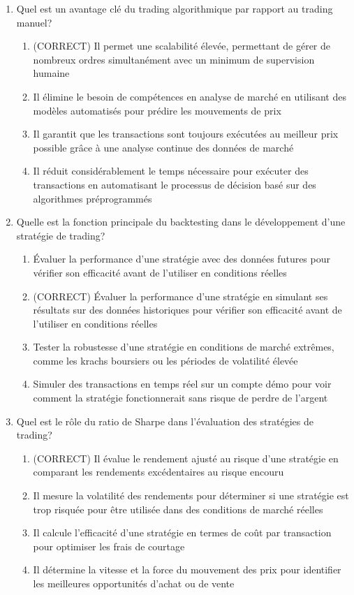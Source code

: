 \documentclass[a4paper,12pt]{article}
\begin{document}
\begin{enumerate}
    \item Quel est un avantage clé du trading algorithmique par rapport au trading manuel?
    \begin{enumerate}[label=(\Alph*)]
        \item (CORRECT) Il permet une scalabilité élevée, permettant de gérer de nombreux ordres simultanément avec un minimum de supervision humaine
        \item Il élimine le besoin de compétences en analyse de marché en utilisant des modèles automatisés pour prédire les mouvements de prix
        \item Il garantit que les transactions sont toujours exécutées au meilleur prix possible grâce à une analyse continue des données de marché
        \item Il réduit considérablement le temps nécessaire pour exécuter des transactions en automatisant le processus de décision basé sur des algorithmes préprogrammés
    \end{enumerate}

    \item Quelle est la fonction principale du backtesting dans le développement d'une stratégie de trading?
    \begin{enumerate}[label=(\Alph*)]
        \item Évaluer la performance d'une stratégie avec des données futures pour vérifier son efficacité avant de l'utiliser en conditions réelles
        \item (CORRECT) Évaluer la performance d'une stratégie en simulant ses résultats sur des données historiques pour vérifier son efficacité avant de l'utiliser en conditions réelles
        \item Tester la robustesse d'une stratégie en conditions de marché extrêmes, comme les krachs boursiers ou les périodes de volatilité élevée
        \item Simuler des transactions en temps réel sur un compte démo pour voir comment la stratégie fonctionnerait sans risque de perdre de l'argent
    \end{enumerate}

    \item Quel est le rôle du ratio de Sharpe dans l'évaluation des stratégies de trading?
    \begin{enumerate}[label=(\Alph*)]
        \item (CORRECT) Il évalue le rendement ajusté au risque d'une stratégie en comparant les rendements excédentaires au risque encouru
        \item Il mesure la volatilité des rendements pour déterminer si une stratégie est trop risquée pour être utilisée dans des conditions de marché réelles
        \item Il calcule l'efficacité d'une stratégie en termes de coût par transaction pour optimiser les frais de courtage
        \item Il détermine la vitesse et la force du mouvement des prix pour identifier les meilleures opportunités d'achat ou de vente
    \end{enumerate}


\end{enumerate}
\end{document}
